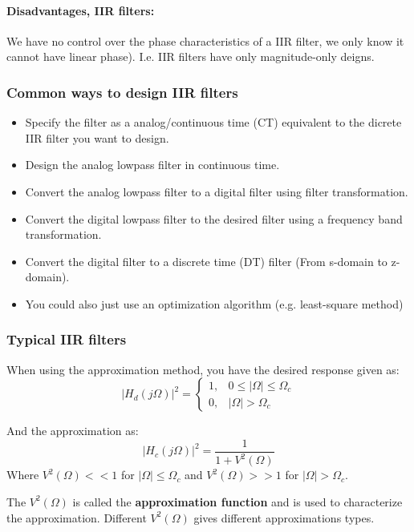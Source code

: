 \documentclass{article}
\begin{document}
\paragraph{Disadvantages, IIR filters:}
We have no control over the phase characteristics of a IIR filter, we only know it cannot have linear phase). I.e. IIR filters have only magnitude-only deigns.

\subsubsection{Common ways to design IIR filters}
\begin{itemize}
    \item Specify the filter as a analog/continuous time (CT) equivalent to the dicrete IIR filter you want to design.
    \item Design the analog lowpass filter in continuous time.
    \item Convert the analog lowpass filter to a digital filter using filter transformation.
    \item Convert the digital lowpass filter to the desired filter using a frequency band transformation.
    \item Convert the digital filter to a discrete time (DT) filter (From s-domain to z-domain).
    \item You could also just use an optimization algorithm (e.g. least-square method)
\end{itemize}

\subsubsection{Typical IIR filters}
When using the approximation method, you have the desired response given as:
\begin{equation}
    |H_d (j\Omega)|^2 = \begin{cases}
        1, & 0 \leq |\Omega| \leq \Omega_c \\
        0, & |\Omega| > \Omega_c
    \end{cases}
\end{equation}

And the approximation as:
\begin{equation}
    |H_c (j\Omega)|^2 = \frac{1}{1 + V^2(\Omega)}
\end{equation}
Where $V^2(\Omega) << 1$ for $|\Omega| \leq \Omega_c$ and $V^2(\Omega) >> 1$ for $|\Omega| > \Omega_c$.

The $V^2(\Omega)$ is called the \textbf{approximation function} and is used to characterize the approximation. Different $V^2(\Omega)$ gives different approximations types.
\end{document}
